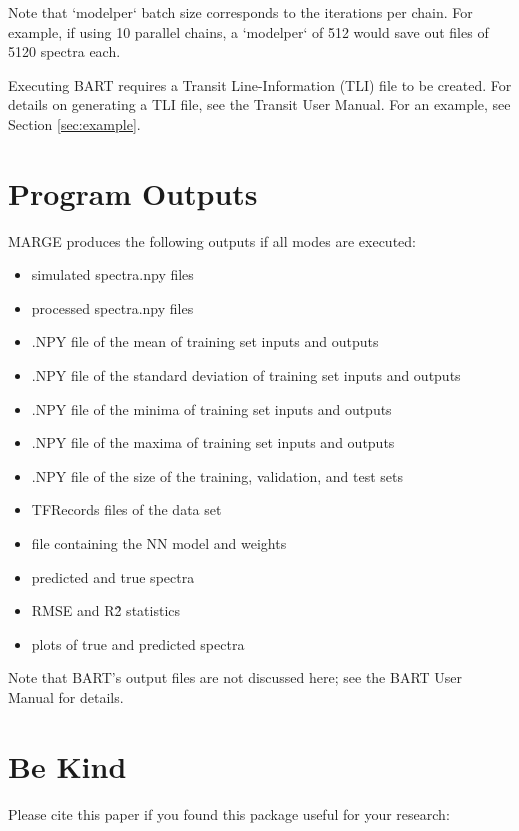 \documentclass[letterpaper, 12pt]{article}
\begin{document}
\noindent Note that `modelper` batch size corresponds to the iterations per 
chain.  For example, if using 10 parallel chains, a `modelper` of 512 would 
save out files of 5120 spectra each.

\noindent  Executing BART requires a Transit Line-Information (TLI) file to 
be created.  For details on generating a TLI file, see the Transit User Manual.
For an example, see Section \ref{sec:example}.



\section{Program Outputs}
\label{sec:outputs}

MARGE produces the following outputs if all modes are executed:

\begin{itemize}
\item simulated spectra.npy files
\item processed spectra.npy files
\item .NPY file of the mean of training set inputs and outputs
\item .NPY file of the standard deviation of training set inputs and outputs
\item .NPY file of the minima of training set inputs and outputs
\item .NPY file of the maxima of training set inputs and outputs
\item .NPY file of the size of the training, validation, and test sets
\item TFRecords files of the data set
\item file containing the NN model and weights
\item predicted and true spectra
\item RMSE and R\^2 statistics
\item plots of true and predicted spectra
\end{itemize}

\noindent Note that BART's output files are not discussed here; see the BART 
User Manual for details.



\section{Be Kind}
\label{sec:bekind}
Please cite this paper if you found this package useful for your research:
\end{document}
